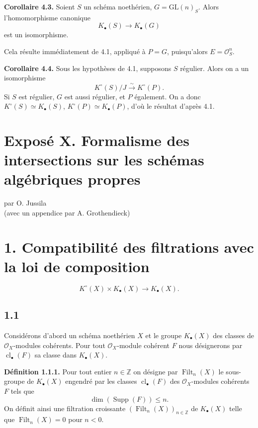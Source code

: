 \documentclass[11pt]{article}
\newcommand{\cl}{\operatorname{cl}}
\providecommand{\Supp}{\operatorname{Supp}}
\begin{document}
\textbf{Corollaire 4.3.} Soient $S$ un schéma noethérien, $G=\mathrm{GL}(n)_S$. Alors l'homomorphisme canonique
\[
K_\bullet(S)\longrightarrow K_\bullet(G)
\]
est un isomorphisme.

Cela résulte immédiatement de 4.1, appliqué à $P=G$, puisqu'alors $E=\mathcal O_S^n$.

\textbf{Corollaire 4.4.} Sous les hypothèses de 4.1, supposons $S$ régulier. Alors on a un isomorphisme
\[
K^\circ(S)/J\xrightarrow{\sim}K^\circ(P).
\]
Si $S$ est régulier, $G$ est aussi régulier, et $P$ également. On a donc $K^\circ(S)\simeq K_\bullet(S)$, $K^\circ(P)\simeq K_\bullet(P)$, d'où le résultat d'après 4.1.



\providecommand{\Filt}{\operatorname{Filt}}
\providecommand{\Coh}{\operatorname{Coh}}
\providecommand{\Ob}{\operatorname{Ob}}
\providecommand{\longg}{\operatorname{long}}
\providecommand{\degtr}{\operatorname{deg.tr}}
\providecommand{\Frac}{\operatorname{Frac}}
\providecommand{\fpqc}{\mathrm{fpqc}}
\providecommand{\Sch}{\operatorname{Sch}}
\providecommand{\Picf}{\operatorname{Pic}}
\providecommand{\Ens}{\operatorname{Ens}}
\providecommand{\im}{\operatorname{Im}}

\section*{Exposé X. Formalisme des intersections sur les schémas algébriques propres}
\begin{center}
par O. Jussila\\
(avec un appendice par A. Grothendieck)
\end{center}

\section*{1. Compatibilité des filtrations avec la loi de composition}
\[
K^\circ(X)\times K_\bullet(X)\longrightarrow K_\bullet(X).
\]

\subsection*{1.1}
Considérons d'abord un schéma noethérien $X$ et le groupe $K_\bullet(X)$ des classes de $\mathcal O_X$-modules cohérents. Pour tout $\mathcal O_X$-module cohérent $F$ nous désignerons par $\cl_\bullet(F)$ sa classe dans $K_\bullet(X)$.

\textbf{Définition 1.1.1.} Pour tout entier $n\in\mathbb Z$ on désigne par $\Filt_n(X)$ le sous-groupe de $K_\bullet(X)$ engendré par les classes $\cl_\bullet(F)$ des $\mathcal O_X$-modules cohérents $F$ tels que
\[
\dim(\Supp(F))\leq n.
\]
On définit ainsi une filtration croissante $(\Filt_n(X))_{n\in\mathbb Z}$ de $K_\bullet(X)$ telle que $\Filt_n(X)=0$ pour $n<0$.
\end{document}
